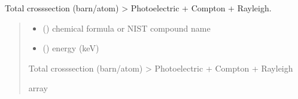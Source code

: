 \documentclass[letterpaper,10pt,english,openany,oneside]{sphinxmanual}
\begin{document}
\begin{fulllineitems}
\label{\detokenize{api/cross_sections:dxraylib.CSb_Total_CP}}
\pysigstartsignatures
{}
\pysigstopsignatures
\sphinxAtStartPar
Total cross\sphinxhyphen{}section (barn/atom) \sphinxhyphen{}\textgreater{} Photoelectric + Compton + Rayleigh.
\begin{quote}\begin{description}
\begin{itemize}
\item {} 
\sphinxAtStartPar
{} () \textendash{} chemical formula or NIST compound name

\item {} 
\sphinxAtStartPar
{} () \textendash{} energy (keV)

\end{itemize}

\sphinxAtStartPar
Total cross\sphinxhyphen{}section (barn/atom) \sphinxhyphen{}\textgreater{} Photoelectric + Compton + Rayleigh

\sphinxAtStartPar
array

\end{description}\end{quote}

\end{fulllineitems}


\begin{DUlineblock}{0em}
\item[] 
\end{DUlineblock}
\end{document}

